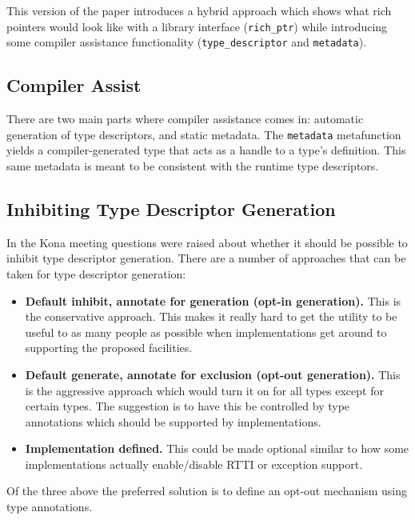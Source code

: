 This version of the paper introduces a hybrid approach which shows what rich pointers would look like with a library interface (\verb+rich_ptr+) while introducing some compiler assistance functionality (\verb+type_descriptor+ and \verb+metadata+).

\subsection{Compiler Assist}

There are two main parts where compiler assistance comes in: automatic generation of type descriptors, and static metadata. The \verb+metadata+ metafunction yields a compiler-generated type that acts as a handle to a type's definition. This same metadata is meant to be consistent with the runtime type descriptors.

\subsection{Inhibiting Type Descriptor Generation}

In the Kona meeting questions were raised about whether it should be possible to inhibit type descriptor generation. There are a number of approaches that can be taken for type descriptor generation:

\begin{itemize}
  \item \textbf{Default inhibit, annotate for generation (opt-in generation).} This
  is the conservative approach. This makes it really hard to get the utility to be
  useful to as many people as possible when implementations get around to supporting 
  the proposed facilities.
  
  \item \textbf{Default generate, annotate for exclusion (opt-out generation).} This
  is the aggressive approach which would turn it on for all types except for certain
  types. The suggestion is to have this be controlled by type annotations which
  should be supported by implementations.
  
  \item \textbf{Implementation defined.} This could be made optional similar to how
  some implementations actually enable/disable RTTI or exception support.
\end{itemize}

Of the three above the preferred solution is to define an opt-out mechanism using type annotations.